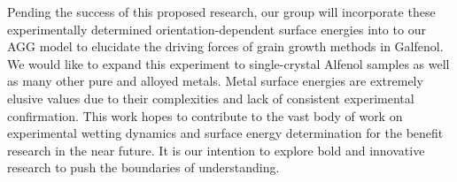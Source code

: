 
Pending the success of this proposed research, our group will incorporate these experimentally determined orientation-dependent surface energies into to our AGG model to elucidate the driving forces of grain growth methods in Galfenol. We would like to expand this experiment to single-crystal Alfenol samples as well as many other pure and alloyed metals. Metal surface energies are extremely elusive values due to their complexities and lack of consistent experimental confirmation. This work hopes to contribute to the vast body of work on experimental wetting dynamics and surface energy determination for the benefit research in the near future. It is our intention to explore bold and innovative research to push the boundaries of understanding.






%

